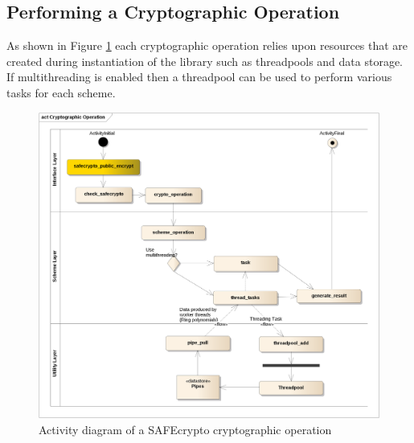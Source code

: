 \newpage
\subsection{Performing a Cryptographic Operation}

As shown in Figure \ref{fig:safecrypto_operation_activity} each cryptographic operation relies upon resources that are created during instantiation of the library such as threadpools and data storage. If multithreading is enabled then a threadpool can be used to perform various tasks for each scheme.

\begin{figure}[H]
\centering
\includegraphics[width=\textwidth]{activity_crypto_operation.png}
\caption{Activity diagram of a SAFEcrypto cryptographic operation}
\label{fig:safecrypto_operation_activity}
\end{figure}


